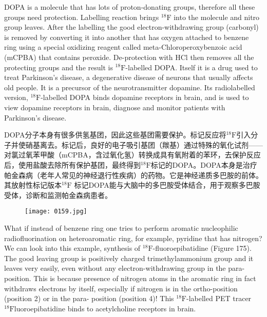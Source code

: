 \documentclass[dvipsnames, svgnames,a4paper,11pt]{article}
\begin{document}
DOPA is a molecule that has lots of proton-donating groups, therefore all these
groups need protection. Labelling reaction brings ${}^\mathrm{18}\mathrm{F}$ into the molecule and nitro
group leaves. After the labelling the good electron-withdrawing group (carbonyl) is
removed by converting it into another that has oxygen attached to benzene ring
using a special oxidizing reagent called meta-Chloroperoxybenzoic acid (mCPBA)
that contains peroxide. De-protection with HCl then removes all the protecting
groups and the result is ${}^\mathrm{18}\mathrm{F}$-labelled DOPA. Itself it is a drug used to treat
Parkinson’s disease, a degenerative disease of neurons that usually affects old
people. It is a precursor of the neurotransmitter dopamine. Its radiolabelled version,
${}^\mathrm{18}\mathrm{F}$-labelled DOPA binds dopamine receptors in brain, and is used to view dopamine
receptors in brain, diagnose and monitor patients with Parkinson’s disease.

DOPA分子本身有很多供氢基团，因此这些基团需要保护。标记反应将${}^\mathrm{18}\mathrm{F}$引入分子并使硝基离去。标记后，良好的电子吸引基团（羰基）通过特殊的氧化试剂——对氯过氧苯甲酸（mCPBA，含过氧化氢）转换成具有氧附着的苯环，去保护反应后，使用盐酸去除所有保护基团，最终得到${}^\mathrm{18}\mathrm{F}$标记的DOPA。DOPA本身是治疗帕金森病（老年人常见的神经退行性疾病）的药物。它是神经递质多巴胺的前体。其放射性标记版本${}^\mathrm{18}\mathrm{F}$ 标记DOPA能与大脑中的多巴胺受体结合，用于观察多巴胺受体，诊断和监测帕金森病患者。

\begin{figure}[h]
	\centering
    \texttt{[image: 0159.jpg]}    
     \label{fig174}
\end{figure}


What if instead of benzene ring one tries to perform aromatic nucleophilic
radiofluorination on heteroaromatic ring, for example, pyridine that has nitrogen? We
can look into this example, synthesis of ${}^\mathrm{18}\mathrm{F}$-fluoroepibatidine (Figure 175). The good
leaving group is positively charged trimethylammonium group and it leaves very
easily, even without any electron-withdrawing group in the para-position. This is
because presence of nitrogen atoms in the aromatic ring in fact withdraws electrons by itself, especially if nitrogen is in the ortho-position (position 2) or in the para-
position (position 4)! This ${}^\mathrm{18}\mathrm{F}$-labelled PET tracer ${}^\mathrm{18}\mathrm{F}$luoroepibatidine binds to
acetylcholine receptors in brain.
\end{document}
